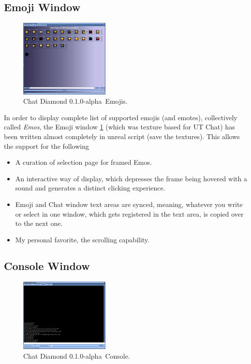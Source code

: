\documentclass{article}
\theoremstyle{definition}
\newcommand{\ChatDiamondVersion}{0.1.0-alpha}
\begin{document}
\subsection{Emoji Window}

\begin{figure}
\centering
\includegraphics[width=0.4\textwidth]{img_emos}
\caption{Chat Diamond \ChatDiamondVersion~Emojis.}
\label{fig:chatdiamond_emos}
\end{figure}

In order to display complete list of supported emojis (and emotes), collectively called \emph{Emos}, the Emoji window \ref{fig:chatdiamond_emos} (which was texture based for UT Chat) has been 
written almost completely in unreal script (save the textures).  This allows the support for the following 
\begin{itemize}
\item A curation of selection page for framed Emos.
\item An interactive way of display, which depresses the frame being hovered with a sound and generates a distinct clicking
experience.
\item Emoji and Chat window text areas are synced, meaning, whatever you write or select in one window, which gets registered
in the text area, is copied over to the next one.
\item My personal favorite, the scrolling capability.
\end{itemize}


\subsection{Console Window}

\begin{figure}
\centering
\includegraphics[width=0.4\textwidth]{img_console}
\caption{Chat Diamond \ChatDiamondVersion~Console.}
\label{fig:chatdiamond_console}
\end{figure}
\end{document}

